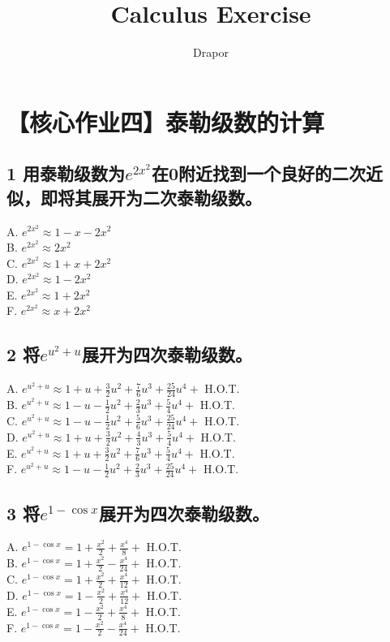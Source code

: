 \documentclass[a5paper, 11pt]{article}
\title{Calculus Exercise}
\author{Drapor}
\begin{document}
\section*{【核心作业四】泰勒级数的计算}
\subsection*{1 \K 用泰勒级数为$e^{2x^2}$在0附近找到一个良好的二次近似，即将其展开为二次泰勒级数。}
A. $e^{2x^2} \approx 1 - x - 2x^2$\\
B. $e^{2x^2} \approx 2x^2$\\
C. $e^{2x^2} \approx 1 + x + 2x^2$\\
D. $e^{2x^2} \approx 1 - 2x^2$\\
E. $e^{2x^2} \approx 1 + 2x^2$\\
F.  $e^{2x^2} \approx x + 2x^2$\\

\subsection*{2 \K 将$e^{u^2+u}$展开为四次泰勒级数。}
A. $e^{u^2+u} \approx 1 + u + \frac{3}{2}u^2 + \frac{7}{6}u^3 + \frac{25}{24}u^4 +$ H.O.T. \\
B. $e^{u^2+u} \approx 1 - u - \frac{1}{2}u^2 + \frac{2}{3}u^3 + \frac{5}{4}u^4 +$ H.O.T. \\
C. $e^{u^2+u} \approx 1 - u - \frac{1}{2}u^2 + \frac{5}{6}u^3 + \frac{25}{24}u^4 +$ H.O.T. \\
D. $e^{u^2+u} \approx 1 + u + \frac{3}{2}u^2 + \frac{4}{3}u^3 + \frac{5}{4}u^4 +$ H.O.T. \\
E. $e^{u^2+u} \approx 1 + u + \frac{3}{2}u^2 + \frac{7}{6}u^3 + \frac{5}{4}u^4 +$ H.O.T. \\
F. $e^{u^2+u} \approx 1 - u - \frac{1}{2}u^2 + \frac{2}{3}u^3 + \frac{25}{24}u^4 +$ H.O.T. \\

\subsection*{3 \K 将$e^{1 - \cos x}$展开为四次泰勒级数。}
A. $e^{1 - \cos x} = 1 + \frac{x^2}{2} + \frac{x^4}{8} +$  H.O.T. \\
B. $e^{1 - \cos x} = 1 + \frac{x^2}{2} - \frac{x^4}{24} +$ H.O.T. \\
C. $e^{1 - \cos x} = 1 + \frac{x^2}{2} + \frac{x^4}{12} +$ H.O.T. \\
D. $e^{1 - \cos x} = 1 - \frac{x^2}{2} + \frac{x^4}{12} +$ H.O.T. \\
E. $e^{1 - \cos x} = 1 - \frac{x^2}{2} + \frac{x^4}{8} +$ H.O.T. \\
F. $e^{1 - \cos x} = 1 - \frac{x^2}{2} - \frac{x^4}{24} +$ H.O.T. \\
\end{document}
